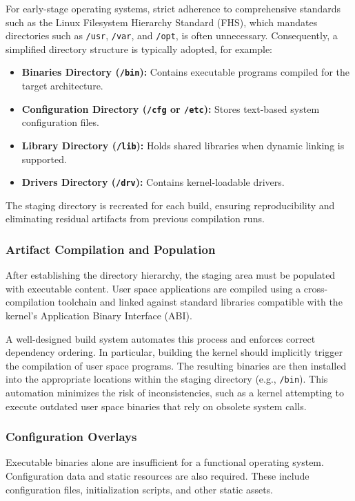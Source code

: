 \documentclass[a4paper,10pt,twoside]{report}
\theoremstyle{definition}
\begin{document}
For early-stage operating systems, strict adherence to comprehensive standards such as the Linux Filesystem Hierarchy Standard (FHS), which mandates directories such as \texttt{/usr}, \texttt{/var}, and \texttt{/opt}, is often unnecessary. Consequently, a simplified directory structure is typically adopted, for example:
\begin{itemize}
\item \textbf{Binaries Directory (\texttt{/bin}):} Contains executable programs compiled for the target architecture.
\item \textbf{Configuration Directory (\texttt{/cfg} or \texttt{/etc}):} Stores text-based system configuration files.
\item \textbf{Library Directory (\texttt{/lib}):} Holds shared libraries when dynamic linking is supported.
\item \textbf{Drivers Directory (\texttt{/drv}):} Contains kernel-loadable drivers.
\end{itemize}
The staging directory is recreated for each build, ensuring reproducibility and eliminating residual artifacts from previous compilation runs.

\subsubsection{Artifact Compilation and Population}

After establishing the directory hierarchy, the staging area must be populated with executable content. User space applications are compiled using a cross-compilation toolchain and linked against standard libraries compatible with the kernel's Application Binary Interface (ABI).

A well-designed build system automates this process and enforces correct dependency ordering. In particular, building the kernel should implicitly trigger the compilation of user space programs. The resulting binaries are then installed into the appropriate locations within the staging directory (e.g., \texttt{/bin}). This automation minimizes the risk of inconsistencies, such as a kernel attempting to execute outdated user space binaries that rely on obsolete system calls.

\subsubsection{Configuration Overlays}

Executable binaries alone are insufficient for a functional operating system. Configuration data and static resources are also required. These include configuration files, initialization scripts, and other static assets.
\end{document}

